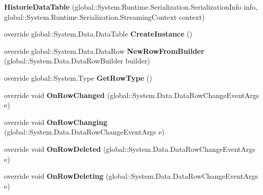 \begin{DoxyCompactItemize}
\item 
{\bfseries Historie\+Data\+Table} (global\+::\+System.\+Runtime.\+Serialization.\+Serialization\+Info info, global\+::\+System.\+Runtime.\+Serialization.\+Streaming\+Context context)\hypertarget{class_products_1_1_data_1_1ds_sage_1_1_historie_data_table_af87bfafc5d8c89e07a622c901cfd3f21}{}\label{class_products_1_1_data_1_1ds_sage_1_1_historie_data_table_af87bfafc5d8c89e07a622c901cfd3f21}

\item 
override global\+::\+System.\+Data.\+Data\+Table {\bfseries Create\+Instance} ()\hypertarget{class_products_1_1_data_1_1ds_sage_1_1_historie_data_table_abdcfe51079ab62c805bbb8609202269b}{}\label{class_products_1_1_data_1_1ds_sage_1_1_historie_data_table_abdcfe51079ab62c805bbb8609202269b}

\item 
override global\+::\+System.\+Data.\+Data\+Row {\bfseries New\+Row\+From\+Builder} (global\+::\+System.\+Data.\+Data\+Row\+Builder builder)\hypertarget{class_products_1_1_data_1_1ds_sage_1_1_historie_data_table_adb8cda2753f520fdf818badd23cd95c8}{}\label{class_products_1_1_data_1_1ds_sage_1_1_historie_data_table_adb8cda2753f520fdf818badd23cd95c8}

\item 
override global\+::\+System.\+Type {\bfseries Get\+Row\+Type} ()\hypertarget{class_products_1_1_data_1_1ds_sage_1_1_historie_data_table_aadca406aa588767926093683ef949357}{}\label{class_products_1_1_data_1_1ds_sage_1_1_historie_data_table_aadca406aa588767926093683ef949357}

\item 
override void {\bfseries On\+Row\+Changed} (global\+::\+System.\+Data.\+Data\+Row\+Change\+Event\+Args e)\hypertarget{class_products_1_1_data_1_1ds_sage_1_1_historie_data_table_a71f1067e194f23674618d3bd97268e3b}{}\label{class_products_1_1_data_1_1ds_sage_1_1_historie_data_table_a71f1067e194f23674618d3bd97268e3b}

\item 
override void {\bfseries On\+Row\+Changing} (global\+::\+System.\+Data.\+Data\+Row\+Change\+Event\+Args e)\hypertarget{class_products_1_1_data_1_1ds_sage_1_1_historie_data_table_a384556f752c60d639c5a1ec20788885f}{}\label{class_products_1_1_data_1_1ds_sage_1_1_historie_data_table_a384556f752c60d639c5a1ec20788885f}

\item 
override void {\bfseries On\+Row\+Deleted} (global\+::\+System.\+Data.\+Data\+Row\+Change\+Event\+Args e)\hypertarget{class_products_1_1_data_1_1ds_sage_1_1_historie_data_table_a24bb25a0312283f75b7b2daa8993f816}{}\label{class_products_1_1_data_1_1ds_sage_1_1_historie_data_table_a24bb25a0312283f75b7b2daa8993f816}

\item 
override void {\bfseries On\+Row\+Deleting} (global\+::\+System.\+Data.\+Data\+Row\+Change\+Event\+Args e)\hypertarget{class_products_1_1_data_1_1ds_sage_1_1_historie_data_table_a679d829beab8797cf6e2e1e4b7e0457e}{}\label{class_products_1_1_data_1_1ds_sage_1_1_historie_data_table_a679d829beab8797cf6e2e1e4b7e0457e}

\end{DoxyCompactItemize}
